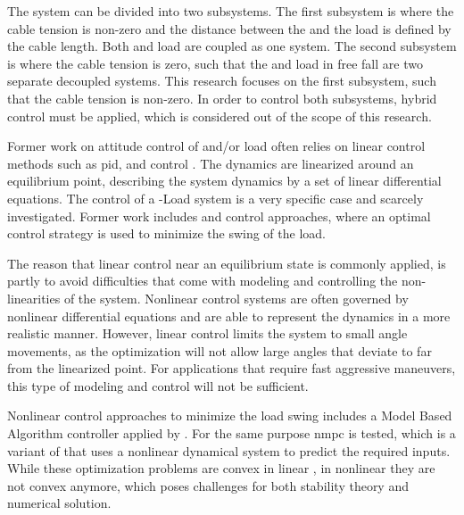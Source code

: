 The system can be divided into two subsystems. The first subsystem is where the cable tension is non-zero and the distance between the  and the load is defined by the cable length. Both  and load are coupled as one system. The second subsystem is where the cable tension is zero, such that the  and load in free fall are two separate decoupled systems. This research focuses on the first subsystem, such that the cable tension is non-zero. In order to control both subsystems, hybrid control must be applied, which is considered out of the scope of this research.

Former work on attitude control of  and/or load often relies on linear control methods such as \acs{pid}\cite{bibid},  \cite{Bangura2014} and  control \cite{bibid}. The dynamics are linearized around an equilibrium point, describing the system dynamics by a set of linear differential equations. 
The control of a -Load system is a very specific case and scarcely investigated. Former work includes  \cite{PraveenThesis} and \cite{bibid} control approaches, where an optimal control strategy is used to minimize the swing of the load. 

The reason that linear control near an equilibrium state is commonly applied, is partly to avoid difficulties that come with modeling and controlling the non-linearities of the system. Nonlinear control systems are often governed by nonlinear differential equations and are able to represent the dynamics in a more realistic manner. However, linear control limits the system to small angle movements, as the optimization will not allow large angles that deviate to far from the linearized point. For applications that require fast aggressive maneuvers, this type of modeling and control will not be sufficient.

Nonlinear control approaches to minimize the load swing includes a Model Based Algorithm controller applied by \cite{Sadr2014}. For the same purpose \acs{nmpc} is tested, which is a variant of  that uses a nonlinear dynamical system to predict the required inputs. While these optimization problems are convex in linear , in nonlinear  they are not convex anymore, which poses challenges for both  stability theory and numerical solution. 

%

